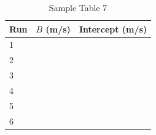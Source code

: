 %
\newpage
\begin{table}[ht!]
    \begin{center}
        \begin{tabular}{l | l | l}
            \textbf{Run} & $B$ (m/s) & \textbf{Intercept} (m/s) \\
            \hline
            1 & & \\
            2 & & \\
            3 & & \\
            \hline
            4 & & \\
            5 & & \\
            6 & & \\
            \hline
        \end{tabular}
    \end{center}
    \caption{Sample Table 7}
\end{table}
%
\newpage
